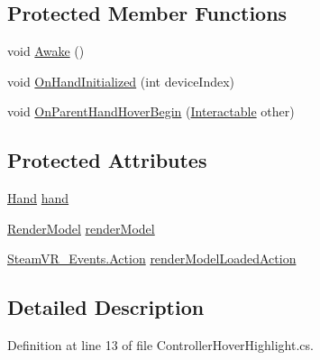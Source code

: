 \subsection*{Protected Member Functions}
\begin{DoxyCompactItemize}
\item 
void \mbox{\hyperlink{class_valve_1_1_v_r_1_1_interaction_system_1_1_controller_hover_highlight_ae54787a63bd1704ab004e00fafe0f9e6}{Awake}} ()
\item 
void \mbox{\hyperlink{class_valve_1_1_v_r_1_1_interaction_system_1_1_controller_hover_highlight_a349f9a50c300a68ecb74b63043017f19}{On\+Hand\+Initialized}} (int device\+Index)
\item 
void \mbox{\hyperlink{class_valve_1_1_v_r_1_1_interaction_system_1_1_controller_hover_highlight_aad83175fd8c987bcb2072e22868f1f4c}{On\+Parent\+Hand\+Hover\+Begin}} (\mbox{\hyperlink{class_valve_1_1_v_r_1_1_interaction_system_1_1_interactable}{Interactable}} other)
\end{DoxyCompactItemize}
\subsection*{Protected Attributes}
\begin{DoxyCompactItemize}
\item 
\mbox{\hyperlink{class_valve_1_1_v_r_1_1_interaction_system_1_1_hand}{Hand}} \mbox{\hyperlink{class_valve_1_1_v_r_1_1_interaction_system_1_1_controller_hover_highlight_af2fcc82b90eb86178dea08e398832156}{hand}}
\item 
\mbox{\hyperlink{class_valve_1_1_v_r_1_1_interaction_system_1_1_render_model}{Render\+Model}} \mbox{\hyperlink{class_valve_1_1_v_r_1_1_interaction_system_1_1_controller_hover_highlight_a0474eb445f4e010a261a5b4c5e5031b4}{render\+Model}}
\item 
\mbox{\hyperlink{class_valve_1_1_v_r_1_1_steam_v_r___events_1_1_action}{Steam\+V\+R\+\_\+\+Events.\+Action}} \mbox{\hyperlink{class_valve_1_1_v_r_1_1_interaction_system_1_1_controller_hover_highlight_a7a576679245177cb0e5ecd9479901184}{render\+Model\+Loaded\+Action}}
\end{DoxyCompactItemize}


\subsection{Detailed Description}


Definition at line 13 of file Controller\+Hover\+Highlight.\+cs.



